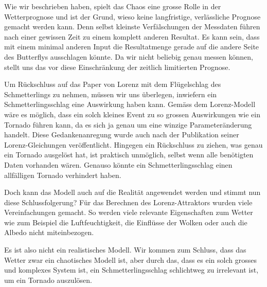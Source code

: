 
Wie wir beschrieben haben, spielt das Chaos eine grosse Rolle in der Wetterprognose und ist der Grund, wieso keine langfristige, verlässliche Prognose gemacht werden kann. Denn selbst kleinste Verfälschungen der Messdaten führen nach einer gewissen Zeit zu einem komplett anderen Resultat. Es kann sein, dass mit einem minimal anderen Input die Resultatmenge gerade auf die andere Seite des Butterflys ausschlagen könnte. Da wir nicht beliebig genau messen können, stellt uns das vor diese Einschränkung der zeitlich limitierten Prognose.

Um Rückschluss auf das Paper von Lorenz mit dem Flügelschlag des Schmetterlings zu nehmen, müssen wir uns überlegen, inwiefern ein Schmetterlingsschlag eine Auswirkung haben kann. Gemäss dem Lorenz-Modell wäre es möglich, dass ein solch kleines Event zu so grossen Auswirkungen wie ein Tornado führen kann, da es sich ja genau um eine winzige Parameteränderung handelt. Diese Gedankenanregung wurde auch nach der Publikation seiner Lorenz-Gleichungen veröffentlicht. Hingegen ein Rückschluss zu ziehen, was genau ein Tornado ausgelöst hat, ist praktisch unmöglich, selbst wenn alle benötigten Daten vorhanden wären. Genauso könnte ein Schmetterlingsschlag einen allfälligen Tornado verhindert haben.

Doch kann das Modell auch auf die Realität angewendet werden und stimmt nun diese Schlussfolgerung? Für das Berechnen des Lorenz-Attraktors wurden viele Vereinfachungen gemacht. So werden viele relevante Eigenschaften zum Wetter wie zum Beispiel die Luftfeuchtigkeit, die Einflüsse der Wolken oder auch die Albedo nicht miteinbezogen. 

Es ist also nicht ein realistisches Modell. Wir kommen zum Schluss, dass das Wetter zwar ein chaotisches Modell ist, aber durch das, dass es ein solch grosses und komplexes System ist, ein Schmetterlingsschlag schlichtweg zu irrelevant ist, um ein Tornado auszulösen. 